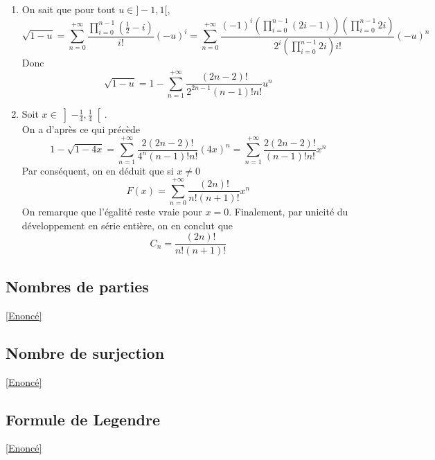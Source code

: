 \documentclass[8pt]{book}
\begin{document}
\begin{enumerate}[leftmargin=*]
		Puisque $F$ est continue sur $\left]-\frac{1}{4},\frac{1}{4}\right[$, $f$ l'est également.
		Ainsi d'après la contraposée du théorème des valeurs intermédiaires, $f$ ne change pas de signe sur $\left]-\frac{1}{4},\frac{1}{4}\right[$ et puisque $f(0)=-1$, on a \[2xF(x)<1\]
		Or $2xX_1\geq 1$ donc \[F(x)=\begin{cases}
			\frac{1-\sqrt{1-4x}}{2x}&\mbox{si } x\ne 0\\
			1 &\mbox{sinon}
		\end{cases}\]
		\item On sait que pour tout $u\in]-1,1[$, \[\sqrt{1-u}=\sum_{n=0}^{+\infty}\frac{\prod_{i=0}^{n-1}(\frac{1}{2}-i)}{i!}(-u)^i=\sum_{n=0}^{+\infty}\frac{(-1)^i\left(\prod_{i=0}^{n-1}(2i-1)\right)\left(\prod_{i=0}^{n-1}2i\right)}{2^i\left(\prod_{i=0}^{n-1}2i\right)i!}(-u)^n\]
		Donc \[\sqrt{1-u}=1-\sum_{n=1}^{+\infty}\frac{(2n-2)!}{2^{2n-1}(n-1)!n!}u^n\]
		\item Soit $x\in\left]-\frac{1}{4},\frac{1}{4}\right[$.\\
		On a d'après ce qui précède \[1-\sqrt{1-4x}=\sum_{n=1}^{+\infty}\frac{2(2n-2)!}{4^n(n-1)!n!}(4x)^n=\sum_{n=1}^{+\infty}\frac{2(2n-2)!}{(n-1)!n!}x^n\]
		Par conséquent, on en déduit que si $x\ne 0$
		\[F(x)=\sum_{n=0}^{+\infty}\frac{(2n)!}{n!(n+1)!}x^n\]
		On remarque que l'égalité reste vraie pour $x=0$.
		Finalement, par unicité du développement en série entière, on en conclut que \[C_n=\frac{(2n)!}{n!(n+1)!}\]
	\end{enumerate}
	\subsection{Nombres de parties}
	\label{Nombres de parties corrigé}
	\textcolor{blue}{\hyperref[Nombres de parties]{[Enoncé]}}\\
	
	\subsection{Nombre de surjection}
	\label{Nombre de surjection corrigé}
		\textcolor{blue}{\hyperref[Nombre de surjection]{[Enoncé]}}\\
	
	\subsection{Formule de Legendre}
	\label{Formule de Legendre corrigé}
		\textcolor{blue}{\hyperref[Formule de Legendre]{[Enoncé]}}\\
	
\end{document}
